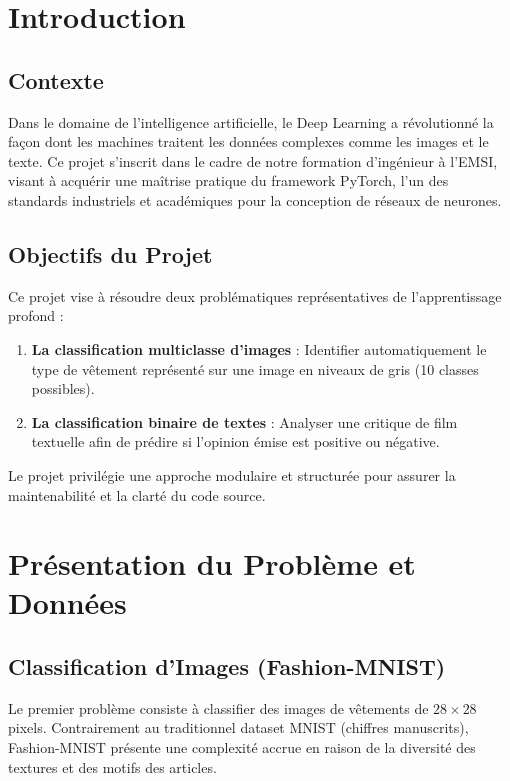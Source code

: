 \documentclass[12pt,a4paper,oneside]{report}
\begin{document}
\tableofcontents

\chapter{Introduction}

\section{Contexte}
Dans le domaine de l'intelligence artificielle, le Deep Learning a révolutionné la façon dont les machines traitent les données complexes comme les images et le texte. Ce projet s'inscrit dans le cadre de notre formation d'ingénieur à l'EMSI, visant à acquérir une maîtrise pratique du framework PyTorch, l'un des standards industriels et académiques pour la conception de réseaux de neurones.

\section{Objectifs du Projet}
Ce projet vise à résoudre deux problématiques représentatives de l'apprentissage profond :
\begin{enumerate}
    \item \textbf{La classification multiclasse d'images} : Identifier automatiquement le type de vêtement représenté sur une image en niveaux de gris (10 classes possibles).
    \item \textbf{La classification binaire de textes} : Analyser une critique de film textuelle afin de prédire si l'opinion émise est positive ou négative.
\end{enumerate}

Le projet privilégie une approche modulaire et structurée pour assurer la maintenabilité et la clarté du code source.

\chapter{Présentation du Problème et Données}

\section{Classification d'Images (Fashion-MNIST)}
Le premier problème consiste à classifier des images de vêtements de $28 \times 28$ pixels. Contrairement au traditionnel dataset MNIST (chiffres manuscrits), Fashion-MNIST présente une complexité accrue en raison de la diversité des textures et des motifs des articles.
\end{document}
